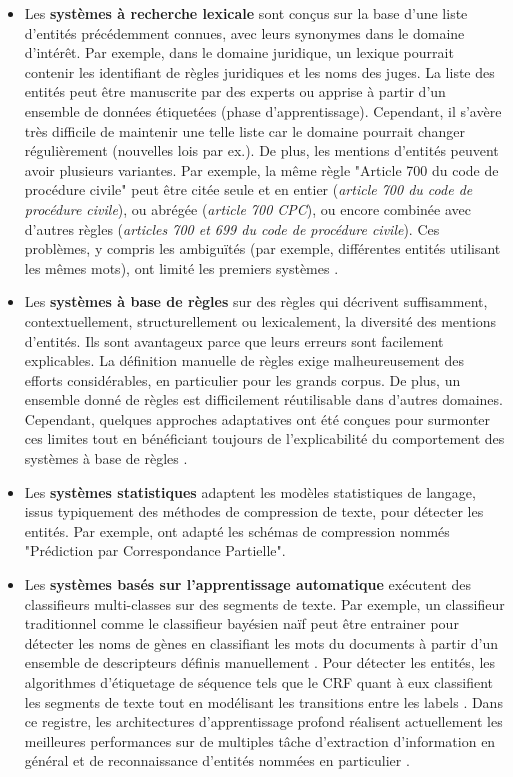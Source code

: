 \begin{itemize}
\item Les \textbf{systèmes à recherche lexicale} sont conçus sur la base d'une liste d'entités précédemment connues, avec leurs synonymes dans le domaine d'intérêt. Par exemple, dans le domaine juridique, un lexique pourrait contenir les identifiant de règles juridiques et les noms des juges. La liste des entités peut être manuscrite par des experts ou apprise à partir d'un ensemble de données étiquetées (phase d'apprentissage). Cependant, il s'avère très difficile de maintenir une telle liste car le domaine pourrait changer régulièrement (nouvelles lois par ex.). De plus, les mentions d'entités peuvent avoir plusieurs variantes. Par exemple, la même règle "Article 700 du code de procédure civile" peut \^etre citée seule et en entier (\textit{article 700 du code de procédure civile}), ou abrégée (\textit{article 700 CPC}), ou encore combinée avec d'autres règles (\textit{articles 700 et 699 du code de procédure civile}). Ces problèmes, y compris les ambiguïtés (par exemple, différentes entités utilisant les mêmes mots), ont limité les premiers systèmes \citep{palmer1997learnedLookup}.

\item Les \textbf{systèmes à base de règles} sur des règles qui décrivent suffisamment, contextuellement, structurellement ou lexicalement, la diversité des mentions d'entités. Ils sont avantageux parce que leurs erreurs sont facilement explicables. La définition manuelle de règles exige malheureusement des efforts considérables, en particulier pour les grands corpus. De plus, un ensemble donné de règles est difficilement réutilisable dans d'autres domaines. Cependant, quelques approches adaptatives ont été conçues pour surmonter ces limites tout en bénéficiant toujours de l'explicabilité du comportement des systèmes à base de règles \citep{siniakov2008gropusrulebased,chiticariu2010adaptativerulebased}.

\item Les \textbf{systèmes statistiques} adaptent les modèles statistiques de langage, issus typiquement des méthodes de compression de texte, pour détecter les entités. Par exemple, \citet{witten1999languagemodel} ont adapté les schémas de compression nommés "Prédiction par Correspondance Partielle".

\item Les \textbf{systèmes basés sur l'apprentissage automatique} exécutent des classifieurs multi-classes sur des segments de texte. Par exemple, un classifieur traditionnel comme le classifieur bayésien naïf peut être entrainer pour détecter les noms de gènes en classifiant les mots du documents à partir d'un ensemble de descripteurs définis manuellement \citep{persson2012nbbioner}. Pour détecter les entités, les algorithmes d'étiquetage de séquence tels que le CRF quant à eux classifient les segments de texte tout en modélisant les transitions entre les labels \citep{finkel2005stanfordcrfner}. Dans ce registre, les architectures d'apprentissage profond réalisent actuellement les meilleures performances sur de multiples tâche d'extraction d'information en général et de reconnaissance d'entités nommées en particulier \citep{lample2016nnner}.
\end{itemize}
